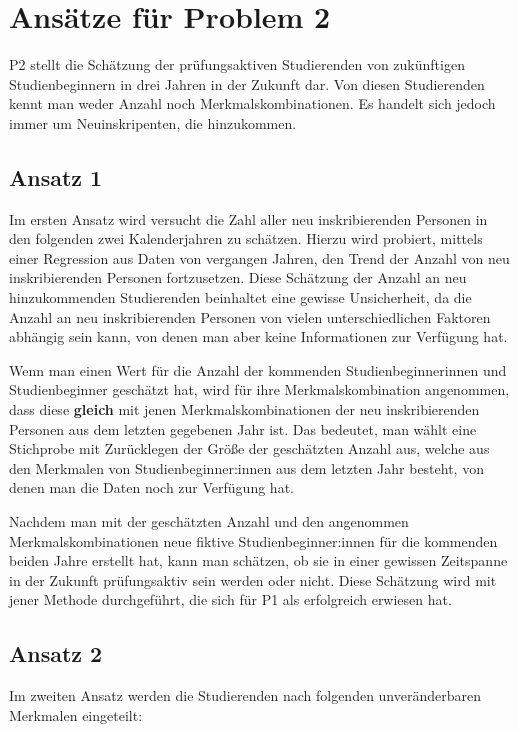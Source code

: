 

\section{Ans\"atze f\"ur Problem 2}
P2 stellt die Sch\"atzung der pr\"ufungsaktiven Studierenden von zuk\"unftigen Studienbeginnern in drei Jahren in der Zukunft dar. Von diesen Studierenden
kennt man weder Anzahl noch Merkmalskombinationen. Es handelt sich jedoch immer um Neuinskripenten, die hinzukommen.

\subsection{Ansatz 1}
Im ersten Ansatz wird versucht die Zahl aller neu inskribierenden Personen in den folgenden zwei Kalenderjahren zu sch\"atzen. Hierzu wird probiert, mittels einer Regression aus
Daten von vergangen Jahren, den Trend der Anzahl von neu inskribierenden Personen fortzusetzen. Diese Sch\"atzung der Anzahl an neu hinzukommenden Studierenden beinhaltet
eine gewisse Unsicherheit, da die Anzahl an neu inskribierenden Personen von vielen unterschiedlichen Faktoren abh\"angig sein kann, von denen man 
aber keine Informationen zur Verf\"ugung hat.

Wenn man einen Wert f\"ur die Anzahl der kommenden Studienbeginnerinnen und Studienbeginner gesch\"atzt hat, wird f\"ur ihre Merkmalskombination angenommen,
dass diese \textbf{gleich} mit jenen Merkmalskombinationen der neu inskribierenden Personen aus dem letzten gegebenen Jahr ist. Das bedeutet, man w\"ahlt eine Stichprobe mit Zur\"ucklegen 
der Gr\"o{\ss}e der gesch\"atzten Anzahl aus, welche aus den Merkmalen von Studienbeginner:innen aus dem letzten Jahr besteht, von denen man die Daten 
noch zur Verf\"ugung hat.

Nachdem man mit der gesch\"atzten Anzahl und den angenommen Merkmalskombinationen neue fiktive Studienbeginner:innen f\"ur die kommenden beiden Jahre erstellt hat, kann man
sch\"atzen, ob sie in einer gewissen Zeitspanne in der Zukunft pr\"ufungsaktiv sein werden oder nicht. Diese Sch\"atzung wird mit jener Methode durchgef\"uhrt, die
sich f\"ur P1 als erfolgreich erwiesen hat.


\subsection{Ansatz 2}
Im zweiten Ansatz werden die Studierenden nach folgenden unver\"anderbaren Merkmalen eingeteilt:

